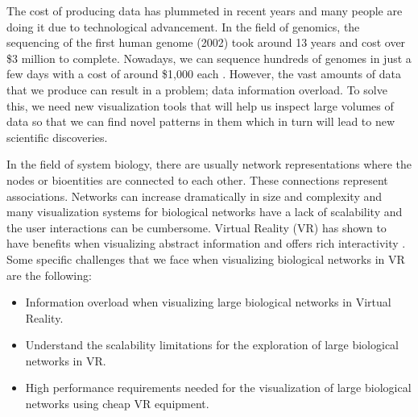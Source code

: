 
The cost of producing data has plummeted in recent years and many people are doing it due to technological advancement. In the field of genomics, the sequencing of the first human genome (2002) took around 13 years and cost over \$3 million to complete. Nowadays, we can sequence hundreds of genomes in just a few days with a cost of around \$1,000 each \cite{big_biological_impacts_bd}. However, the vast amounts of data that we produce can result in a problem; data information overload. To solve this, we need new visualization tools that will help us inspect large volumes of data so that we can find novel patterns in them which in turn will lead to new scientific discoveries.



In the field of system biology, there are usually network representations where the nodes or bioentities are connected to each other. These connections represent associations. Networks can increase dramatically in size and complexity and many visualization systems for biological networks have a lack of scalability and the user interactions can be cumbersome. Virtual Reality (VR) has shown to have benefits when visualizing abstract information and offers rich interactivity \cite{zhang_paciorkowski_craig_cui_2019}. Some specific challenges that we face when visualizing biological networks in VR are the following:
\begin{itemize}
  \item Information overload when visualizing large biological networks in Virtual Reality.
  \item Understand the scalability limitations for the exploration of large biological networks in VR.
  \item High performance requirements needed for the visualization of large biological networks using cheap VR equipment.
\end{itemize}

